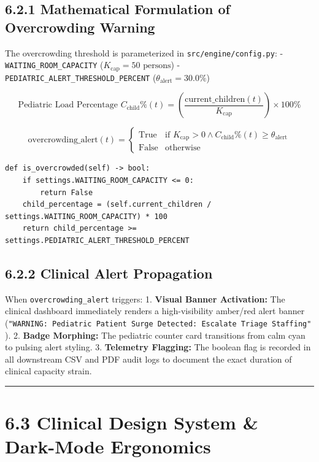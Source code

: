 \subsection{6.2.1 Mathematical Formulation of Overcrowding
Warning}\label{mathematical-formulation-of-overcrowding-warning}

The overcrowding threshold is parameterized in
\texttt{src/engine/config.py}: - \texttt{WAITING\_ROOM\_CAPACITY}
(\(K_{\text{cap}} = 50\text{ persons}\)) -
\texttt{PEDIATRIC\_ALERT\_THRESHOLD\_PERCENT}
(\(\theta_{\text{alert}} = 30.0\%\))

\[\text{Pediatric Load Percentage } C_{\text{child}}\%(t) = \left( \frac{\text{current\_children}(t)}{K_{\text{cap}}} \right) \times 100\%\]

\[\text{overcrowding\_alert}(t) = \begin{cases} \text{True} & \text{if } K_{\text{cap}} > 0 \land C_{\text{child}}\%(t) \ge \theta_{\text{alert}} \\ \text{False} & \text{otherwise} \end{cases}\]

\begin{verbatim}
def is_overcrowded(self) -> bool:
    if settings.WAITING_ROOM_CAPACITY <= 0:
        return False
    child_percentage = (self.current_children / settings.WAITING_ROOM_CAPACITY) * 100
    return child_percentage >= settings.PEDIATRIC_ALERT_THRESHOLD_PERCENT
\end{verbatim}

\subsection{6.2.2 Clinical Alert
Propagation}\label{clinical-alert-propagation}

When \texttt{overcrowding\_alert} triggers: 1. \textbf{Visual Banner
Activation:} The clinical dashboard immediately renders a
high-visibility amber/red alert banner
(\texttt{"WARNING:\ Pediatric\ Patient\ Surge\ Detected:\ Escalate\ Triage\ Staffing"}).
2. \textbf{Badge Morphing:} The pediatric counter card transitions from
calm cyan to pulsing alert styling. 3. \textbf{Telemetry Flagging:} The
boolean flag is recorded in all downstream CSV and PDF audit logs to
document the exact duration of clinical capacity strain.

\begin{center}\rule{0.5\linewidth}{0.5pt}\end{center}

\section{6.3 Clinical Design System \& Dark-Mode
Ergonomics}\label{clinical-design-system-dark-mode-ergonomics}

